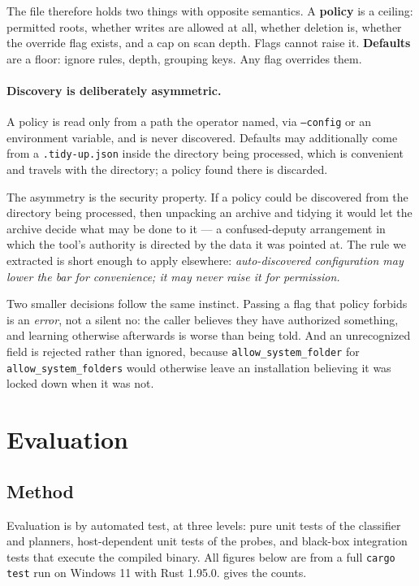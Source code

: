 \documentclass[11pt,a4paper]{article}
\newcommand{\code}[1]{\texttt{\small #1}}
\begin{document}
The file therefore holds two things with opposite semantics. A \textbf{policy}
is a ceiling: permitted roots, whether writes are allowed at all, whether
deletion is, whether the override flag exists, and a cap on scan depth. Flags
cannot raise it. \textbf{Defaults} are a floor: ignore rules, depth, grouping
keys. Any flag overrides them.

\paragraph{Discovery is deliberately asymmetric.}
A policy is read only from a path the operator named, via \code{--config} or an
environment variable, and is never discovered. Defaults may additionally come
from a \code{.tidy-up.json} inside the directory being processed, which is
convenient and travels with the directory; a policy found there is discarded.

The asymmetry is the security property. If a policy could be discovered from
the directory being processed, then unpacking an archive and tidying it would
let the archive decide what may be done to it --- a confused-deputy arrangement
\cite{hardy1988} in which the tool's authority is directed by the data it was
pointed at. The rule we extracted is short enough to apply elsewhere:
\emph{auto-discovered configuration may lower the bar for convenience; it may
never raise it for permission.}

Two smaller decisions follow the same instinct. Passing a flag that policy
forbids is an \emph{error}, not a silent no: the caller believes they have
authorized something, and learning otherwise afterwards is worse than being
told. And an unrecognized field is rejected rather than ignored, because
\code{allow\_system\_folder} for \code{allow\_system\_folders} would otherwise
leave an installation believing it was locked down when it was not.

\section{Evaluation}
\label{sec:eval}

\subsection{Method}

Evaluation is by automated test, at three levels: pure unit tests of the classifier
and planners, host-dependent unit tests of the probes, and black-box integration tests
that execute the compiled binary. All figures below are from a full
\code{cargo test} run on Windows 11 with Rust 1.95.0.  gives the
counts.
\end{document}
